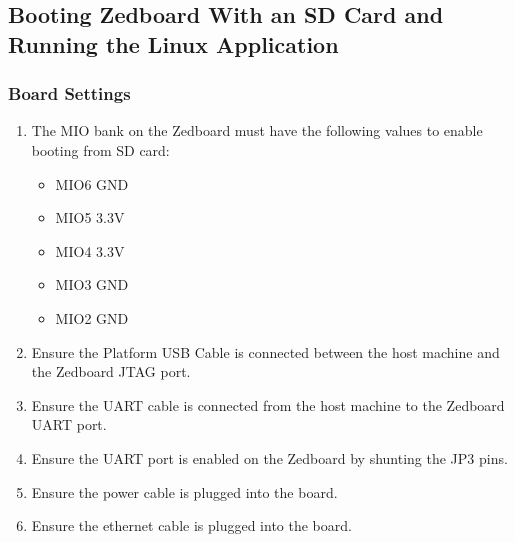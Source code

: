 \documentclass[12pt]{article}
\begin{document}
\subsection{Booting Zedboard With an SD Card and Running the Linux Application}
\subsubsection{Board Settings}
\begin{enumerate}
\item The MIO bank on the Zedboard must have the following values to enable booting from SD card:
\begin{itemize}
\item MIO6 GND
\item MIO5 3.3V
\item MIO4 3.3V
\item MIO3 GND
\item MIO2 GND
\end{itemize}
\item Ensure the Platform USB Cable is connected between the host machine and the Zedboard JTAG port.
\item Ensure the UART cable is connected from the host machine to the Zedboard UART port.
\item Ensure the UART port is enabled on the Zedboard by shunting the JP3 pins.
\item Ensure the power cable is plugged into the board.
\item Ensure the ethernet cable is plugged into the board.
\end{enumerate}
\end{document}
